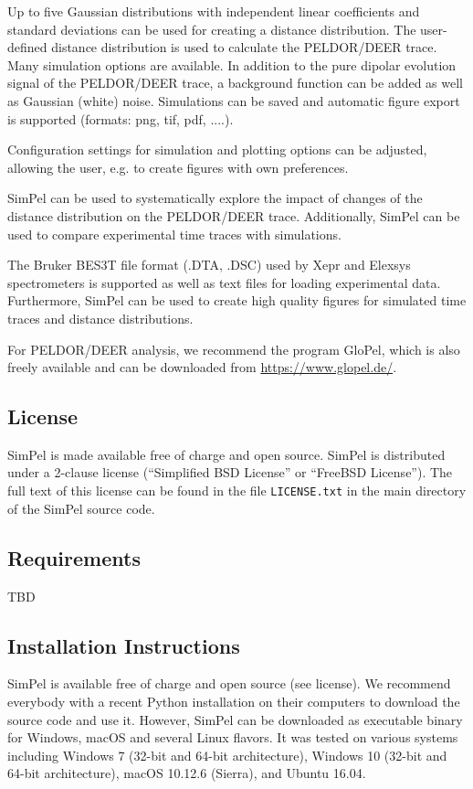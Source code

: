 \documentclass[pdftex,bezier,german,a4,twoside, headexclude,12pt,nochapterprefix, titlepage]{extarticle}
\newcommand{\simpel}{\textsf{SimPel}}
\begin{document}
Up to five Gaussian distributions with independent linear coefficients and standard deviations can be used for creating a distance distribution. The user-defined distance distribution is used to calculate the PELDOR/DEER trace. Many simulation options are available. In addition to the pure dipolar evolution signal of the PELDOR/DEER trace, a background function can be added as well as Gaussian (white) noise. Simulations can be saved and automatic figure export is supported (formats: png, tif, pdf, ....).

Configuration settings for simulation and plotting options can be adjusted, allowing the user, e.g. to create figures with own preferences.

\simpel{} can be used to systematically explore the impact of changes of the distance distribution on the PELDOR/DEER trace. Additionally, \simpel{} can be used to compare experimental time traces with simulations.

The Bruker BES3T file format (.DTA, .DSC) used by Xepr and Elexsys spectrometers
is supported as well as text files for loading experimental data. Furthermore, \simpel{} can be used to create high quality figures for simulated time traces and distance distributions.

For PELDOR/DEER analysis, we recommend the program GloPel, which is also freely available and can be downloaded from {\url{https://www.glopel.de/}}.

\subsection{License}

\simpel{} is made available free of charge and open source. 
\simpel{} is distributed under a 2-clause license (“Simplified BSD License” or “FreeBSD License”). The full text of this license can be found in the file \texttt{LICENSE.txt} in the main directory of the \simpel{} source code.


\subsection{Requirements}

TBD


\subsection{Installation Instructions}

\simpel{} is available free of charge and open source (see license). We recommend everybody with a recent Python installation on their computers to download the source code and use it. 
However, 
\simpel{} can be downloaded as executable binary for Windows, macOS and several Linux flavors.
It was tested on various systems including Windows 7 (32-bit and 64-bit architecture), Windows 10 (32-bit and 64-bit architecture), macOS 10.12.6 (Sierra),
and Ubuntu 16.04.\\
\end{document}
